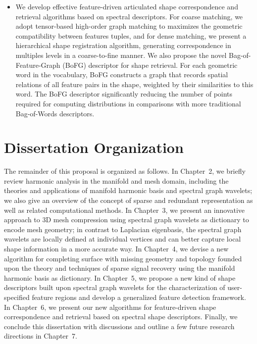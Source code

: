 \begin{itemize}
\item We develop effective feature-driven articulated shape
correspondence and retrieval algorithms based on spectral
descriptors. For coarse matching, we adopt tensor-based high-order 
graph matching to maximizes the geometric compatibility between 
features tuples, and for dense matching, we present a hierarchical 
shape registration algorithm, generating correspondence in multiples 
levels in a coarse-to-fine manner. We also propose the novel 
Bag-of-Feature-Graph (BoFG) descriptor for shape retrieval. 
For each geometric word in the vocabulary, BoFG constructs a graph that records
spatial relations of all feature pairs in the shape, weighted by their
similarities to this word. The BoFG descriptor significantly reducing the 
number of points required for computing distributions in comparisons 
with more traditional Bag-of-Words descriptors.

\end{itemize}

\section{Dissertation Organization}
The remainder of this proposal is organized as follows.
In Chapter~2, we briefly review harmonic analysis in the manifold and mesh
domain, including the theories and applications of manifold harmonic basis
and spectral graph wavelets; we also give an overview of the concept of
sparse and redundant representation as well as related computational methods.
In Chapter~3, we present an innovative approach to 3D mesh compression
using spectral graph wavelets as dictionary to encode mesh geometry; in
contrast to Laplacian eigenbasis, the spectral graph wavelets are locally
defined at individual vertices and can better capture local shape
information in a more accurate way.
In Chapter~4, we devise a new algorithm for completing surface with missing geometry
and topology founded upon the theory and techniques of sparse signal recovery
using the manifold harmonic basis as dictionary.
In Chapter~5, we propose a new kind of shape descriptors built upon
spectral graph wavelets for the characterization of user-specified feature regions
and develop a generalized feature detection framework.
In Chapter~6, we present our new algorithms for feature-driven shape correspondence 
and retrieval based on spectral shape descriptors. 
Finally, we conclude this dissertation 
with discussions and outline a few future research directions in Chapter~7.   
